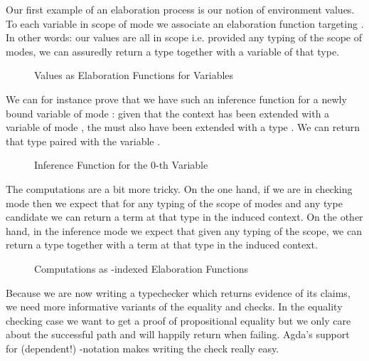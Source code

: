 Our first example of an elaboration process is our notion of environment values.
To each variable in scope of mode  we associate an elaboration function
targeting . In other words: our values are all in scope i.e. provided any
typing of the scope of modes, we can assuredly return a type together with a
variable of that type.

\begin{figure}[h!]
\caption{Values as Elaboration Functions for Variables\label{fig:elabvalues}}
\end{figure}

We can for instance prove that we have such an inference function for a newly bound
variable of mode : given that the context has been extended with a variable
of mode , the  must also have been extended with a type .
We can return that type paired with the variable .

\begin{figure}[h]
\caption{Inference Function for the 0-th Variable\label{fig:elabvar0}}
\end{figure}

The computations are a bit more tricky. On the one hand, if we are in
checking mode then we expect that for any typing of the scope of modes
and any type candidate we can  return a term at that type
in the induced context. On the other hand, in the inference mode we
expect that given any typing of the scope, we can  return
a type together with a term at that type in the induced context.

\begin{figure}[h]
\caption{Computations as -indexed Elaboration Functions\label{fig:elabcomputations}}
\end{figure}

Because we are now writing a typechecker which returns evidence of its
claims, we need more informative variants of the equality and
 checks.
%
In the equality checking case we want to get a proof of propositional
equality but we only care about the successful path and will happily
return  when failing. Agda's support for (dependent!)
-notation makes writing the check really easy.

